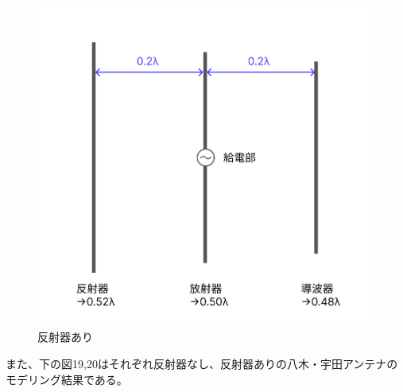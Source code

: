 \documentclass[dvipdfmx,autodetect-engine,titlepage]{jsarticle}
\begin{document}
\begin{figure}[H]
  \centering
  \includegraphics[scale=0.28]{yagiuda1.png}
  \caption{反射器あり}\label{fig:図20}
\end{figure}

また、下の図19,20はそれぞれ反射器なし、反射器ありの八木・宇田アンテナのモデリング結果である。\\\\\\
\end{document}
